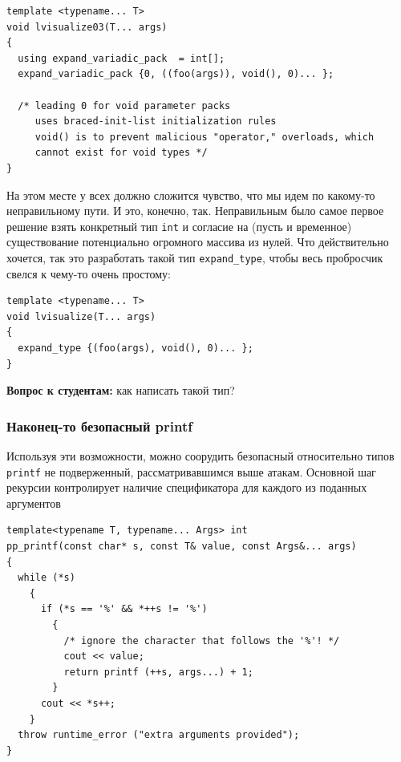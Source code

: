\documentclass[a4paper,12pt,oneside]{article}
\newif\ifanswers
\begin{document}
\begin{lstlisting}
template <typename... T>
void lvisualize03(T... args)
{
  using expand_variadic_pack  = int[];
  expand_variadic_pack {0, ((foo(args)), void(), 0)... };

  /* leading 0 for void parameter packs
     uses braced-init-list initialization rules
     void() is to prevent malicious "operator," overloads, which
     cannot exist for void types */
}
\end{lstlisting}

На этом месте у всех должно сложится чувство, что мы идем по какому-то неправильному пути. И это, конечно, так. Неправильным было самое первое решение взять конкретный тип \lstinline!int! и согласие на (пусть и временное) существование потенциально огромного массива из нулей. Что действительно хочется, так это разработать такой тип \lstinline!expand_type!, чтобы весь пробросчик свелся к чему-то очень простому:

\begin{lstlisting}
template <typename... T>
void lvisualize(T... args)
{
  expand_type {(foo(args), void(), 0)... };
}
\end{lstlisting}

\textbf{Вопрос к студентам:} как написать такой тип?

\ifanswers
Ответ в общем-то очевиден:

\begin{lstlisting}
struct expand_type
{
  template <typename... T> expand_type(T&&...) {}
};
\end{lstlisting}

И это все. Тип занимает один байт и содержит единственный конструктор, берущий аргументы по набору универсальных ссылок.
\fi

\subsubsection{Наконец-то безопасный printf}\label{TypesafePrintf}

Используя эти возможности, можно соорудить безопасный относительно типов \lstinline!printf! не подверженный, рассматривавшимся выше атакам. Основной шаг рекурсии контролирует наличие спецификатора для каждого из поданных аргументов

\begin{lstlisting}
template<typename T, typename... Args> int
pp_printf(const char* s, const T& value, const Args&... args)
{
  while (*s)
    {
      if (*s == '%' && *++s != '%')
        {
          /* ignore the character that follows the '%'! */
          cout << value;
          return printf (++s, args...) + 1;
        }
      cout << *s++;
    }
  throw runtime_error ("extra arguments provided");
}
\end{lstlisting}
\end{document}
